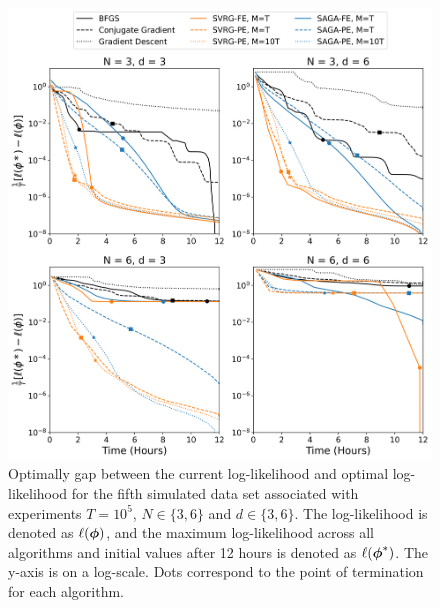 \documentclass[12pt]{article}
\begin{document}
\begin{figure}[H]
    \centering
    \includegraphics[width=6.5in]{../plt/log-like_v_time_T-100000-004.png}
    \caption{Optimally gap between the current log-likelihood and optimal log-likelihood for the fifth simulated data set associated with experiments $T=10^{5}$, $N \in \{3,6\}$ and $d \in \{3,6\}$. The log-likelihood is denoted as $\ell(\boldsymbol{\phi})$, and the maximum log-likelihood across all algorithms and initial values after 12 hours is denoted as $\ell(\boldsymbol{\phi}^*)$. The y-axis is on a log-scale. Dots correspond to the point of termination for each algorithm.}
\end{figure}
\end{document}
